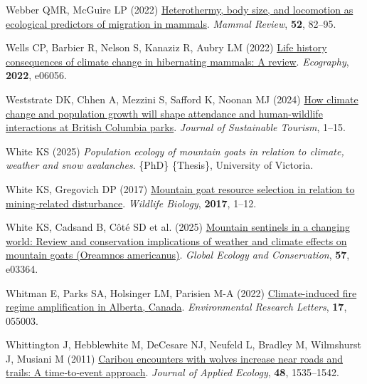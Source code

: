 \documentclass[
  12pt,
]{article}
\newlength{\cslhangindent}
\newenvironment{CSLReferences}[2] %
 {\begin{list}{}{%
  \setlength{\itemindent}{0pt}
  \setlength{\leftmargin}{0pt}
  \setlength{\parsep}{0pt}
  \ifodd #1
   \setlength{\leftmargin}{\cslhangindent}
   \setlength{\itemindent}{-1\cslhangindent}
  \fi
  \setlength{\itemsep}{#2\baselineskip}}}
 {\end{list}}
\begin{document}
\begin{CSLReferences}{1}{0}
Webber QMR, McGuire LP (2022) \href{https://doi.org/10.1111/mam.12263}{Heterothermy, body size, and locomotion as ecological predictors of migration in mammals}. \emph{Mammal Review}, \textbf{52}, 82--95.

Wells CP, Barbier R, Nelson S, Kanaziz R, Aubry LM (2022) \href{https://doi.org/10.1111/ecog.06056}{Life history consequences of climate change in hibernating mammals: A review}. \emph{Ecography}, \textbf{2022}, e06056.

Weststrate DK, Chhen A, Mezzini S, Safford K, Noonan MJ (2024) \href{https://doi.org/10.1080/09669582.2024.2331228}{How climate change and population growth will shape attendance and human-wildlife interactions at {British} {Columbia} parks}. \emph{Journal of Sustainable Tourism}, 1--15.

White KS (2025) \emph{\emph{Population ecology of mountain goats in relation to climate, weather and snow avalanches}}. \{PhD\} \{Thesis\}, University of Victoria.

White KS, Gregovich DP (2017) \href{https://doi.org/10.2981/wlb.00277}{Mountain goat resource selection in relation to mining‐related disturbance}. \emph{Wildlife Biology}, \textbf{2017}, 1--12.

White KS, Cadsand B, Côté SD et al. (2025) \href{https://doi.org/10.1016/j.gecco.2024.e03364}{Mountain sentinels in a changing world: {Review} and conservation implications of weather and climate effects on mountain goats ({Oreamnos} americanus)}. \emph{Global Ecology and Conservation}, \textbf{57}, e03364.

Whitman E, Parks SA, Holsinger LM, Parisien M-A (2022) \href{https://doi.org/10.1088/1748-9326/ac60d6}{Climate-induced fire regime amplification in {Alberta}, {Canada}}. \emph{Environmental Research Letters}, \textbf{17}, 055003.

Whittington J, Hebblewhite M, DeCesare NJ, Neufeld L, Bradley M, Wilmshurst J, Musiani M (2011) \href{https://doi.org/10.1111/j.1365-2664.2011.02043.x}{Caribou encounters with wolves increase near roads and trails: A time‐to‐event approach}. \emph{Journal of Applied Ecology}, \textbf{48}, 1535--1542.


\end{CSLReferences}
\end{document}
